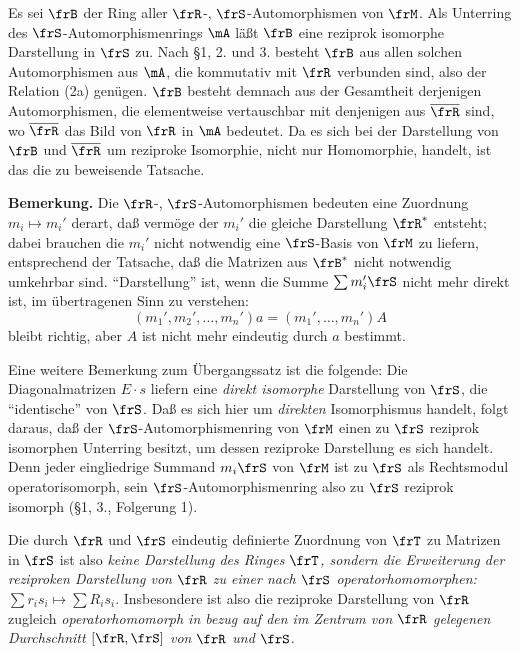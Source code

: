 Es sei \(\frB\) der Ring aller \(\frR\)-, \(\frS\)-Automorphismen von \(\frM\). Als Unterring des \(\frS\)-Automorphismenrings \(\mA\) läßt \(\frB\) eine reziprok isomorphe Darstellung in \(\frS\) zu. Nach §1, 2. und 3. besteht \(\frB\) aus allen solchen Automorphismen aus \(\mA\), die kommutativ mit \(\frR\) verbunden sind, also der Relation (2a) genügen. \(\frB\) besteht demnach aus der Gesamtheit derjenigen Automorphismen, die elementweise vertauschbar mit denjenigen aus \(\overline{\frR}\) sind, wo \(\overline{\frR}\) das Bild von \(\frR\) in \(\mA\) bedeutet. Da es sich bei der Darstellung von \(\frB\) und \(\overline{\frR}\) um reziproke Isomorphie, nicht nur Homomorphie, handelt, ist das die zu beweisende Tatsache.

\noindent\textbf{Bemerkung.} Die \(\frR\)-, \(\frS\)-Automorphismen bedeuten eine Zuordnung \(m_i\mapsto m_i'\) derart, daß vermöge der \(m_i'\) die gleiche Darstellung \(\frR^*\) entsteht; dabei brauchen die \(m_i'\) nicht notwendig eine \(\frS\)-Basis von \(\frM\) zu liefern, entsprechend der Tatsache, daß die Matrizen aus \(\frB^*\) nicht notwendig umkehrbar sind. ``Darstellung'' ist, wenn die Summe \(\sum m_i'\frS\) nicht mehr direkt ist, im übertragenen Sinn zu verstehen:
\[
        (m_1',m_2',\ldots,m_n')a=(m_1',\ldots,m_n')A
\]
bleibt richtig, aber \(A\) ist nicht mehr eindeutig durch \(a\) bestimmt.

Eine weitere Bemerkung zum Übergangssatz ist die folgende: Die Diagonalmatrizen \(E\cdot s\) liefern eine \emph{direkt isomorphe} Darstellung von \(\frS\), die ``identische'' von \(\frS\). Daß es sich hier um \emph{direkten} Isomorphismus handelt, folgt daraus, daß der \(\frS\)-Automorphismenring von \(\frM\) einen zu \(\frS\) reziprok isomorphen Unterring besitzt, um dessen reziproke Darstellung es sich handelt. Denn jeder eingliedrige Summand \(m_i\frS\) von \(\frM\) ist zu \(\frS\) als Rechtsmodul operatorisomorph, sein \(\frS\)-Automorphismenring also zu \(\frS\) reziprok isomorph (§1, 3., Folgerung 1).

Die durch \(\frR\) und \(\frS\) eindeutig definierte Zuordnung von \(\frT\) zu Matrizen in \(\frS\) ist also \emph{keine Darstellung des Ringes \(\frT\), sondern die Erweiterung der reziproken Darstellung von \(\frR\) zu einer nach \(\frS\) operatorhomomorphen:} \(\sum r_i s_i\longmapsto \sum R_i s_i.\)
Insbesondere ist also die reziproke Darstellung von \(\frR\) zugleich \emph{operatorhomomorph in bezug auf den im Zentrum von \(\frR\) gelegenen Durchschnitt \([\frR,\frS]\) von \(\frR\) und \(\frS\).}

